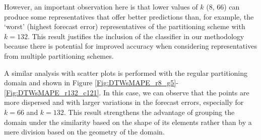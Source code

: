 However, an important observation here is that lower values of $k$ (8, 66) can produce some representatives that offer better predictions than, for example, the `worst' (highest forecast error) representatives of the partitioning scheme with $k=132$. This result justifies the inclusion of the classifier in our methodology because there is potential for improved accuracy when considering representatives from multiple partitioning schemes.

A similar analysis with scatter plots is performed with the regular partitioning domain and shown in Figure \ref{Fig:DTWsMAPE_r8_g5}-\ref{Fig:DTWsMAPE_r132_c121}. In this case, we can observe that the points are more dispersed and with larger variations in the forecast errors, especially for $k = 66$ and $k = 132$. This result strengthens the advantage of grouping the domain under the similarity based on the shape of its elements rather than by a mere division based on the geometry of the domain.

